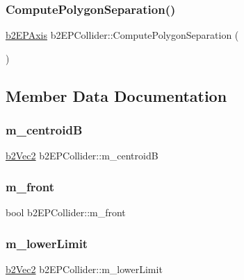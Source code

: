 \subsubsection{\texorpdfstring{ComputePolygonSeparation()}{ComputePolygonSeparation()}}
{\footnotesize\ttfamily \mbox{\hyperlink{structb2_e_p_axis}{b2\+E\+P\+Axis}} b2\+E\+P\+Collider\+::\+Compute\+Polygon\+Separation (\begin{DoxyParamCaption}{ }\end{DoxyParamCaption})}



\subsection{Member Data Documentation}
\mbox{\label{structb2_e_p_collider_a8635888e0c36a76b08b0b0ec7cf6e6e9}} 
\subsubsection{\texorpdfstring{m\_centroidB}{m\_centroidB}}
{\footnotesize\ttfamily \mbox{\hyperlink{structb2_vec2}{b2\+Vec2}} b2\+E\+P\+Collider\+::m\+\_\+centroidB}

\mbox{\label{structb2_e_p_collider_aa9443e27e043bf80916992ca96bdedd2}} 
\subsubsection{\texorpdfstring{m\_front}{m\_front}}
{\footnotesize\ttfamily bool b2\+E\+P\+Collider\+::m\+\_\+front}

\mbox{\label{structb2_e_p_collider_a6b48818ac312de825aaf55b46aceea1e}} 
\subsubsection{\texorpdfstring{m\_lowerLimit}{m\_lowerLimit}}
{\footnotesize\ttfamily \mbox{\hyperlink{structb2_vec2}{b2\+Vec2}} b2\+E\+P\+Collider\+::m\+\_\+lower\+Limit}

